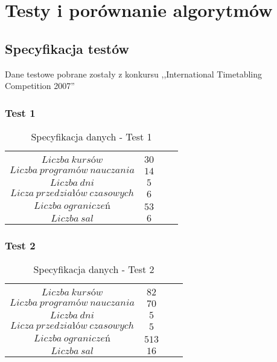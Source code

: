 \chapter{Testy i porównanie algorytmów}
\section{Specyfikacja testów}
Dane testowe pobrane zostały z konkursu ,,International Timetabling Competition 2007''
\subsection{Test 1}
\begin{table}[H]
\begin{center}

\begin{tabular}{ |c|c|c|c| }
\multicolumn{1}{r}{}
 &  \multicolumn{1}{c}{$$}
 & \multicolumn{1}{c}{$$} 
 \\
\cline{1-2}
$Liczba\ kursów$ & $30$\\
\cline{1-2}
$Liczba\ programów\ nauczania$ & $14$\\
\cline{1-2}
$Liczba\ dni$ & $5$ \\
\cline{1-2}
$Licza\ przedziałów\ czasowych$ & $6$ \\
\cline{1-2}
$Liczba\ ograniczeń$ & $53$ \\
\cline{1-2}
$Liczba\ sal$ & $6$ \\
\cline{1-2}
\end{tabular}
\end{center}
\caption {Specyfikacja danych - Test 1}
\end{table}
\subsection{Test 2}
\begin{table}[H]
\begin{center}

\begin{tabular}{ |c|c|c|c| }
\multicolumn{1}{r}{}
 &  \multicolumn{1}{c}{$$}
 & \multicolumn{1}{c}{$$} 
 \\
\cline{1-2}
$Liczba\ kursów$ & $82$\\
\cline{1-2}
$Liczba\ programów\ nauczania$ & $70$\\
\cline{1-2}
$Liczba\ dni$ & $5$ \\
\cline{1-2}
$Licza\ przedziałów\ czasowych$ & $5$ \\
\cline{1-2}
$Liczba\ ograniczeń$ & $513$ \\
\cline{1-2}
$Liczba\ sal$ & $16$ \\
\cline{1-2}
\end{tabular}
\end{center}
\caption {Specyfikacja danych - Test 2}
\end{table}
